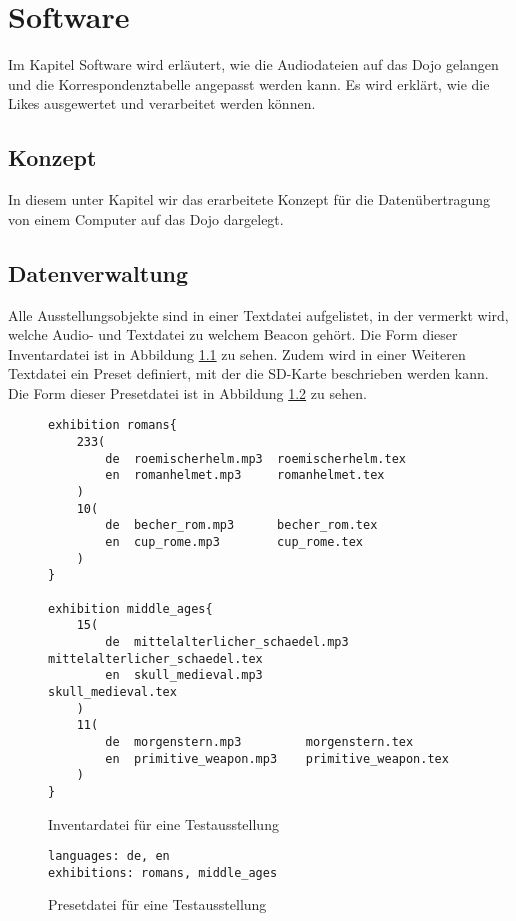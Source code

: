 \chapter{Software}
\label{Software}
\thispagestyle{fancy} 
Im Kapitel Software wird erläutert, wie die Audiodateien auf das Dojo gelangen und die Korrespondenztabelle angepasst werden kann. Es wird erklärt, wie die Likes ausgewertet und verarbeitet werden können.
\section{Konzept}
In diesem unter Kapitel wir das erarbeitete Konzept für die Datenübertragung von einem Computer auf das Dojo dargelegt.

\section{Datenverwaltung}
Alle Ausstellungsobjekte sind in einer Textdatei aufgelistet, in der vermerkt wird, welche Audio- und Textdatei zu welchem Beacon gehört.
Die Form dieser Inventardatei ist in Abbildung \ref{inventory_syntax} zu sehen.
Zudem wird in einer Weiteren Textdatei ein Preset definiert, mit der die SD-Karte beschrieben werden kann.
Die Form dieser Presetdatei ist in Abbildung \ref{preset_syntax} zu sehen.

\begin{figure}
	\begin{verbatim}
exhibition romans{
    233(
        de  roemischerhelm.mp3  roemischerhelm.tex
        en  romanhelmet.mp3     romanhelmet.tex
    )
    10(
        de  becher_rom.mp3      becher_rom.tex
        en  cup_rome.mp3        cup_rome.tex
    )
}

exhibition middle_ages{
    15(
        de  mittelalterlicher_schaedel.mp3  mittelalterlicher_schaedel.tex
        en  skull_medieval.mp3              skull_medieval.tex
    )
    11(
        de  morgenstern.mp3         morgenstern.tex
        en  primitive_weapon.mp3    primitive_weapon.tex
    )
}
	\end{verbatim}
	\caption{Inventardatei für eine Testausstellung}
	\label{inventory_syntax}
\end{figure}

\begin{figure}
	\begin{verbatim}
languages: de, en
exhibitions: romans, middle_ages
	\end{verbatim}
	\caption{Presetdatei für eine Testausstellung}
	\label{preset_syntax}
\end{figure}

